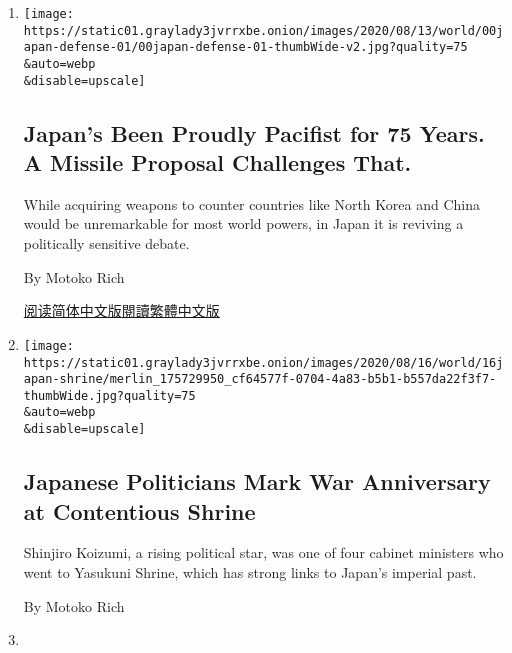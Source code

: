 \begin{enumerate}
\def\labelenumi{\arabic{enumi}.}
\item
  \href{/2020/08/16/world/asia/japan-military-missiles-pacifist.html}{}

  \texttt{[image: https://static01.graylady3jvrrxbe.onion/images/2020/08/13/world/00japan-defense-01/00japan-defense-01-thumbWide-v2.jpg?quality=75\\\&auto=webp\\\&disable=upscale]}

  \hypertarget{japans-been-proudly-pacifist-for-75-years-a-missile-proposal-challenges-that}{%
  \subsection{Japan's Been Proudly Pacifist for 75 Years. A Missile
  Proposal Challenges
  That.}\label{japans-been-proudly-pacifist-for-75-years-a-missile-proposal-challenges-that}}

  While acquiring weapons to counter countries like North Korea and
  China would be unremarkable for most world powers, in Japan it is
  reviving a politically sensitive debate.

  By Motoko Rich

  \href{https://cn.nytimes3xbfgragh.onion/asia-pacific/20200817/japan-military-missiles-pacifist/}{阅读简体中文版}\href{https://cn.nytimes3xbfgragh.onion/asia-pacific/20200817/japan-military-missiles-pacifist/zh-hant/}{閱讀繁體中文版}
\item
  \href{/2020/08/15/world/asia/japan-yasukuni-shrine.html}{}

  \texttt{[image: https://static01.graylady3jvrrxbe.onion/images/2020/08/16/world/16japan-shrine/merlin\_175729950\_cf64577f-0704-4a83-b5b1-b557da22f3f7-thumbWide.jpg?quality=75\\\&auto=webp\\\&disable=upscale]}

  \hypertarget{japanese-politicians-mark-war-anniversary-at-contentious-shrine}{%
  \subsection{Japanese Politicians Mark War Anniversary at Contentious
  Shrine}\label{japanese-politicians-mark-war-anniversary-at-contentious-shrine}}

  Shinjiro Koizumi, a rising political star, was one of four cabinet
  ministers who went to Yasukuni Shrine, which has strong links to
  Japan's imperial past.

  By Motoko Rich
\item
  \href{/2020/08/06/us/coronavirus-us.html}{}


\end{enumerate}
